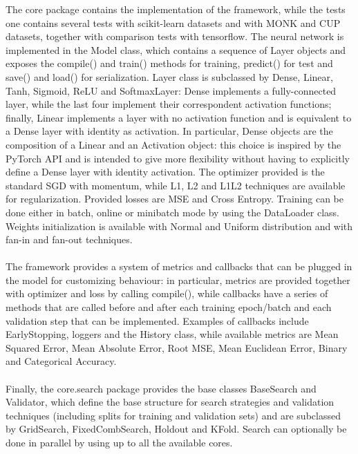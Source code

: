 The core package contains the implementation of the framework, while the tests one contains several tests with scikit-learn datasets
and with MONK and CUP datasets, together with comparison tests with tensorflow. The neural network is implemented in the Model class,
which contains a sequence of Layer objects and exposes the compile() and train() methods for training, predict() for test and save() and
load() for serialization. Layer class is subclassed by Dense, Linear, Tanh, Sigmoid, ReLU and SoftmaxLayer: Dense implements a fully-connected
layer, while the last four implement their correspondent activation functions; finally, Linear implements a layer with no activation function
and is equivalent to a Dense layer with identity as activation. In particular, Dense objects are the composition of a Linear and an Activation
object: this choice is inspired by the PyTorch API and is intended to give more flexibility without having to explicitly define a Dense layer
with identity activation.
The optimizer provided is the standard SGD with momentum, while L1, L2 and L1L2 techniques are available for regularization. Provided losses
are MSE and Cross Entropy. Training can be done either in batch, online or minibatch mode by using the DataLoader class. Weights initialization
is available with Normal and Uniform distribution and with fan-in and fan-out techniques.

\paragraph{}

The framework provides a system of metrics and callbacks that can be plugged in the model for customizing behaviour: in particular, metrics
are provided together with optimizer and loss by calling compile(), while callbacks have a series of methods that are called before and after
each training epoch/batch and each validation step that can be implemented. Examples of callbacks include EarlyStopping, loggers and the History
class, while available metrics are Mean Squared Error, Mean Absolute Error, Root MSE, Mean Euclidean Error, Binary and Categorical Accuracy.

\paragraph{}

Finally, the core.search package provides the base classes BaseSearch and Validator, which define the base structure for search strategies and
validation techniques (including splits for training and validation sets) and are subclassed by GridSearch, FixedCombSearch, Holdout and KFold.
Search can optionally be done in parallel by using up to all the available cores.

